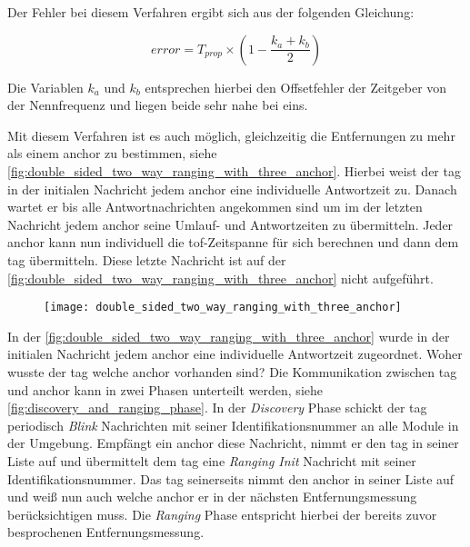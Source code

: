 Der Fehler bei diesem Verfahren ergibt sich aus der folgenden Gleichung:

\begin{equation}
error=T_{prop}\times\left(1-\frac{k_a+k_b}{2}\right)
\end{equation}

Die Variablen $k_a$ und $k_b$ entsprechen hierbei den Offsetfehler der Zeitgeber von der Nennfrequenz und liegen beide sehr nahe bei eins.

Mit diesem Verfahren ist es auch möglich, gleichzeitig die Entfernungen zu mehr als einem \Gls{anchor} zu bestimmen, siehe \autoref{fig:double_sided_two_way_ranging_with_three_anchor}. Hierbei weist der \Gls{tag} in der initialen Nachricht jedem \Gls{anchor} eine individuelle Antwortzeit zu. Danach wartet er bis alle Antwortnachrichten angekommen sind um im der letzten Nachricht jedem \Gls{anchor} seine Umlauf- und Antwortzeiten zu übermitteln. Jeder \Gls{anchor} kann nun individuell die \Gls{tof}-Zeitspanne für sich berechnen und dann dem \Gls{tag} übermitteln. Diese letzte Nachricht ist auf der \autoref{fig:double_sided_two_way_ranging_with_three_anchor} nicht aufgeführt.

\begin{figure}
	\centering
	\texttt{[image: double\_sided\_two\_way\_ranging\_with\_three\_anchor]}
	\label{fig:double_sided_two_way_ranging_with_three_anchor}
\end{figure}

In der \autoref{fig:double_sided_two_way_ranging_with_three_anchor} wurde in der initialen Nachricht jedem \Gls{anchor} eine individuelle Antwortzeit zugeordnet. Woher wusste der \Gls{tag} welche \Gls{anchor} vorhanden sind? Die Kommunikation zwischen \Gls{tag} und \Gls{anchor} kann in zwei Phasen unterteilt werden, siehe \autoref{fig:discovery_and_ranging_phase}. In der \textit{Discovery} Phase schickt der \Gls{tag} periodisch \textit{Blink} Nachrichten mit seiner \mbox{Identifikationsnummer} an alle Module in der Umgebung. Empfängt ein \Gls{anchor} diese Nachricht, nimmt er den \Gls{tag} in seiner Liste auf und übermittelt dem \Gls{tag} eine \textit{Ranging Init} Nachricht mit seiner Identifikationsnummer. Das \Gls{tag} seinerseits nimmt den \Gls{anchor} in seiner Liste auf und weiß nun auch welche \Gls{anchor} er in der nächsten Entfernungsmessung berücksichtigen muss. Die \textit{Ranging} Phase entspricht hierbei der bereits zuvor besprochenen Entfernungsmessung.


